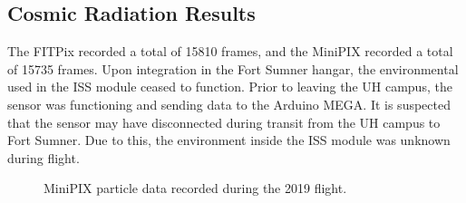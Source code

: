 \subsection{Cosmic Radiation Results}
\label{sec:Cosmic-Radiation-Results}

The FITPix recorded a total of 15810 frames, and the MiniPIX recorded a total of 15735 frames.
Upon integration in the Fort Sumner hangar, the environmental used in the ISS module ceased to function.
Prior to leaving the UH campus, the sensor was functioning and sending data to the Arduino MEGA.
It is suspected that the sensor may have disconnected during transit from the UH campus to Fort Sumner.
Due to this, the environment inside the ISS module was unknown during flight.

\begin{figure}[h!]
\hfill
{}
\hfill
{}
\hfill
\caption{MiniPIX particle data recorded during the 2019 flight.}
\label{fig:minipix-data}
\end{figure}

